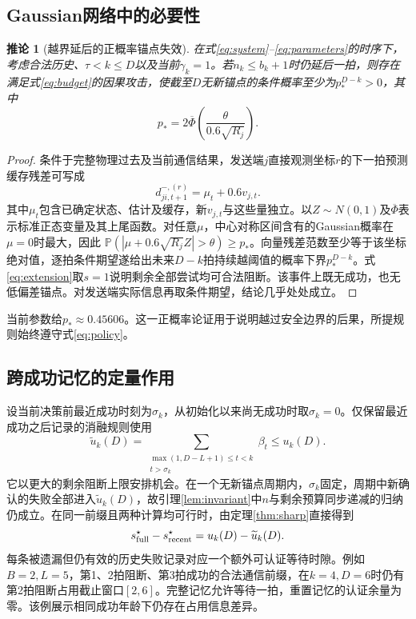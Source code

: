 \documentclass[UTF8,a4paper,zihao=5,fontset=windows]{ctexart}
\newtheorem{corollary}{推论}
\newcommand{\Prb}{\mathbb P}
\begin{document}
\subsection{Gaussian网络中的必要性}
\begin{corollary}[越界延后的正概率锚点失效]\label{cor:gaussian}
在式\eqref{eq:system}--\eqref{eq:parameters}的时序下，考虑合法历史、$\tau<k\le D$以及当前$\gamma_k=1$。若$n_k\le b_k+1$时仍延后一拍，则存在满足式\eqref{eq:budget}的因果攻击，使截至$D$无新锚点的条件概率至少为$p_*^{D-k}>0$，其中
\begin{equation}
p_*=2\overline\Phi\!\left(\frac{\theta}{0.6\sqrt{R_j}}\right).
\label{eq:gaussian}
\end{equation}
\end{corollary}
\begin{proof}
条件于完整物理过去及当前通信结果，发送端$j$直接观测坐标$r$的下一拍预测缓存残差可写成
\[
d_{ji,t+1}^{-,(r)}=\mu_t+0.6v_{j,t}.
\]
其中$\mu_t$包含已确定状态、估计及缓存，新$v_{j,t}$与这些量独立。以$Z\sim N(0,1)$及$\overline\Phi$表示标准正态变量及其上尾函数。对任意$\mu$，中心对称区间含有的Gaussian概率在$\mu=0$时最大，因此
$\Prb(|\mu+0.6\sqrt{R_j}Z|>\theta)\ge p_*$。向量残差范数至少等于该坐标绝对值，逐拍条件期望遂给出未来$D-k$拍持续越阈值的概率下界$p_*^{D-k}$。式\eqref{eq:extension}取$s=1$说明剩余全部尝试均可合法阻断。该事件上既无成功，也无低偏差锚点。对发送端实际信息再取条件期望，结论几乎处处成立。
\end{proof}

当前参数给$p_*\approx0.45606$。这一正概率论证用于说明越过安全边界的后果，所提规则始终遵守式\eqref{eq:policy}。

\subsection{跨成功记忆的定量作用}
设当前决策前最近成功时刻为$\sigma_k$，从初始化以来尚无成功时取$\sigma_k=0$。仅保留最近成功之后记录的消融规则使用
\begin{equation}
\widetilde u_k(D)=
\sum_{\substack{\max(1,D-L+1)\le t<k\\t>\sigma_k}}\beta_t
\le u_k(D).
\label{eq:recent}
\end{equation}
它以更大的剩余阻断上限安排机会。在一个无新锚点周期内，$\sigma_k$固定，周期中新确认的失败全部进入$\widetilde u_k(D)$，故引理\ref{lem:invariant}中$n$与剩余预算同步递减的归纳仍成立。在同一前缀且两种计算均可行时，由定理\ref{thm:sharp}直接得到
\begin{equation}
s^\star_{\rm full}-s^\star_{\rm recent}=u_k(D)-\widetilde u_k(D).
\label{eq:memory}
\end{equation}
每条被遗漏但仍有效的历史失败记录对应一个额外可认证等待时隙。例如$B=2,L=5$，第1、2拍阻断、第3拍成功的合法通信前缀，在$k=4,D=6$时仍有第2拍阻断占用截止窗口$[2,6]$。完整记忆允许等待一拍，重置记忆的认证余量为零。该例展示相同成功年龄下仍存在占用信息差异。
\end{document}

